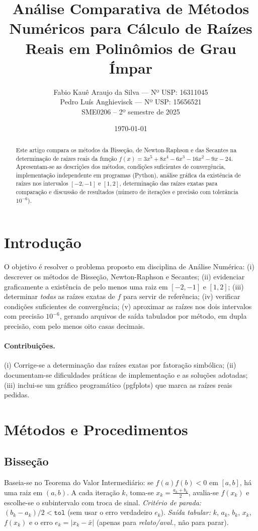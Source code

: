 \documentclass[12pt,a4paper]{article}
\title{Análise Comparativa de Métodos Numéricos para Cálculo de Raízes Reais em Polinômios de Grau Ímpar}
\author{
  Fabio Kauê Araujo da Silva --- Nº USP: 16311045 \\[3pt]
  Pedro Luís Anghievisck --- Nº USP: 15656521 \\[3pt]
  \normalsize SME0206 -- 2º semestre de 2025
}
\date{\today}
\begin{document}
\maketitle

\begin{abstract}
Este artigo compara os métodos da Bisseção, de Newton-Raphson e das Secantes na determinação de raízes reais da função
$f(x)=3x^{5}+8x^{4}-6x^{3}-16x^{2}-9x-24$.
Apresentam-se as descrições dos métodos, condições suficientes de convergência, implementação independente em programas (Python),
análise gráfica da existência de raízes nos intervalos $[-2,-1]$ e $[1,2]$, determinação das raízes exatas para comparação e
discussão de resultados (número de iterações e precisão com tolerância $10^{-6}$).
\end{abstract}

\section{Introdução}
O objetivo é resolver o problema proposto em disciplina de Análise Numérica:
(i) descrever os métodos de Bisseção, Newton-Raphson e Secantes; (ii) evidenciar graficamente a existência de pelo menos uma raiz em
$[-2,-1]$ e $[1,2]$; (iii) determinar \emph{todas} as raízes exatas de $f$ para servir de referência;
(iv) verificar condições suficientes de convergência; (v) aproximar as raízes nos dois intervalos com precisão $10^{-6}$,
gerando arquivos de saída tabulados por método, em dupla precisão, com pelo menos oito casas decimais.

\paragraph{Contribuições.}
(i) Corrige-se a determinação das raízes exatas por fatoração simbólica; (ii) documentam-se dificuldades práticas de implementação
e as soluções adotadas; (iii) inclui-se um gráfico programático (pgfplots) que marca as raízes reais pedidas.

\section{Métodos e Procedimentos}
\subsection{Bisseção}
Baseia-se no Teorema do Valor Intermediário: se $f(a)f(b)<0$ em $[a,b]$, há uma raiz em $(a,b)$.
A cada iteração $k$, toma-se $x_k=\tfrac{a_k+b_k}{2}$, avalia-se $f(x_k)$ e escolhe-se o subintervalo com troca de sinal.
\emph{Critério de parada:} $(b_k-a_k)/2<\texttt{tol}$ (sem usar o erro verdadeiro $e_k$).
\emph{Saída tabular:} $k$, $a_k$, $b_k$, $x_k$, $f(x_k)$ e o erro $e_k=|x_k-\bar{x}|$ (apenas para \emph{relato/aval.}, não para parar).
\end{document}
